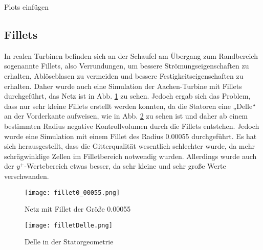 \todo Plots einfügen


\subsection{Fillets}

In realen Turbinen befinden sich an der Schaufel am Übergang zum Randbereich sogenannte Fillets, also Verrundungen, um bessere Strömungseigenschaften zu erhalten, Ablöseblasen zu vermeiden und bessere Festigkeitseigenschaften zu erhalten. Daher wurde auch eine Simulation der Aachen-Turbine mit Fillets durchgeführt, das Netz ist in Abb. \ref{imgFillet1} zu sehen. Jedoch ergab sich das Problem, dass nur sehr kleine Fillets erstellt werden konnten, da die Statoren eine „Delle“ an der Vorderkante aufweisen, wie in Abb. \ref{imgFilletDelle} zu sehen ist und daher ab einem bestimmten Radius negative Kontrollvolumen durch die Fillets entstehen. Jedoch wurde eine Simulation mit einem Fillet des Radius 0.00055 durchgeführt. Es hat sich herausgestellt, dass die Gitterqualität wesentlich schlechter wurde, da mehr schrägwinklige Zellen im Filletbereich notwendig wurden. Allerdings wurde auch der $y^+$-Wertebereich etwas besser, da sehr kleine und sehr große Werte verschwanden.     

  \begin{figure}[H]
	\centering
	\texttt{[image: fillet0\_00055.png]}
	\caption{Netz mit Fillet der Größe 0.00055} \label{imgFillet1}
\end{figure} 

  \begin{figure}[H]
	\centering
	\texttt{[image: filletDelle.png]}
	\caption{Delle in der Statorgeometrie} \label{imgFilletDelle}
\end{figure} 